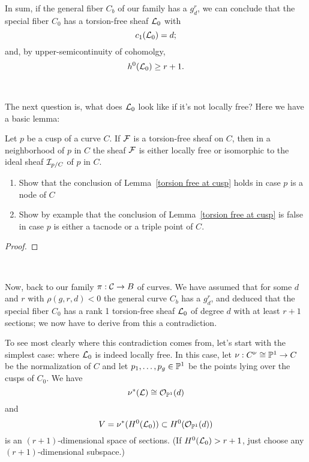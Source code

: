 In sum, if the general fiber $C_b$ of our family has a $g^r_d$, we can conclude that the special fiber $C_0$ has a torsion-free sheaf $\cL_0$ with 
$$
c_1(\cL_0) = d;
$$
and, by upper-semicontinuity of cohomolgy,
$$
h^0(\cL_0) \geq r+1.
$$

\


The next question is, what does $\cL_0$ look like if it's not locally free? Here we have a basic lemma:

\begin{lemma}\label{torsion free at cusp}
Let $p$ be a  cusp of a curve $C$. If $\cF$ is a torsion-free sheaf on $C$, then in a neighborhood of $p$ in $C$ the sheaf $\cF$ is either locally free or isomorphic to the ideal sheaf $\cI_{p/C}$ of $p$ in $C$.
\end{lemma}


\begin{exercise}
\begin{enumerate}
\item Show  that the conclusion of Lemma~\ref{torsion free at cusp} holds in case $p$ is a node of $C$
\item Show by example that the conclusion of Lemma~\ref{torsion free at cusp} is false in case $p$ is either a tacnode or a triple point of $C$.
\end{enumerate}
\end{exercise}

\begin{proof}

\end{proof}

\


Now, back to our family $\pi : \cC \to B$ of curves. We have assumed that for some $d$ and $r$ with $\rho(g,r,d) < 0$ the general curve $C_b$ has a $g^r_d$, and deduced that the special fiber $C_0$ has a rank 1 torsion-free sheaf $\cL_0$ of degree $d$ with at least $r+1$ sections; we now have to derive from this a contradiction.

To see most clearly where this contradiction comes from, let's start with the simplest case: where $\cL_0$ is indeed locally free. In this case, let $\nu :  C^\nu \cong \PP^1 \to C$ be the normalization of $C$ and let $p_1,\dots,p_g \in \PP^1$ be the points lying over the cusps of $C_0$. We have
$$
\nu^*(\cL) \cong \cO_{\PP^1}(d)
$$  
and 
$$
V = \nu^*(H^0(\cL_0)) \subset H^0(\cO_{\PP^1}(d))
$$
is an $(r+1)$-dimensional space of sections. (If $H^0(\cL_0) > r+1$, just choose any $(r+1)$-dimensional subspace.) 


